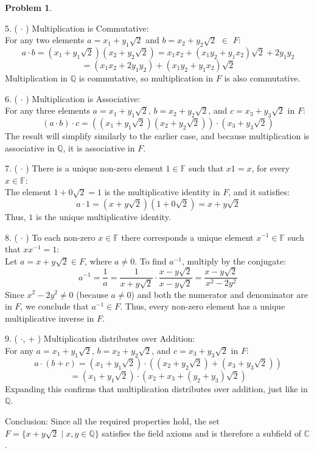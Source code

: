 \documentclass[12pt]{article}
\theoremstyle{definition}
\newtheorem{problem}{Problem}
\begin{document}
\begin{problem}
\begin{solution}
        5. ( $\cdot$ ) Multiplication is Commutative:\\
        For any two elements \( a = x_1 + y_1\sqrt{2} \) and \( b = x_2 + y_2\sqrt{2} \) $\in$ \( F \):
        \[
        a \cdot b = (x_1 + y_1\sqrt{2})(x_2 + y_2\sqrt{2}) = x_1x_2 + (x_1y_2 + y_1x_2)\sqrt{2} + 2y_1y_2
        \]
        \[
        = (x_1x_2 + 2y_1y_2) + (x_1y_2 + y_1x_2)\sqrt{2}
        \]
        Multiplication in \( \mathbb{Q} \) is commutative, so multiplication in \( F \) is also commutative.

        6. ( $\cdot$ ) Multiplication is Associative:\\
        For any three elements \( a = x_1 + y_1\sqrt{2} \), \( b = x_2 + y_2\sqrt{2} \), and \( c = x_3 + y_3\sqrt{2} \) in \( F \):
        \[
        (a \cdot b) \cdot c = \left( (x_1 + y_1\sqrt{2})(x_2 + y_2\sqrt{2}) \right) \cdot (x_3 + y_3\sqrt{2})
        \]
        The result will simplify similarly to the earlier case, and because multiplication is associative in \( \mathbb{Q} \), it is associative in \( F \).

        7. ( $\cdot$ ) There is a unique non-zero element $1 \in \mathbb{F}$ such that $x1 = x$, for every $x\in\mathbb{F}$:\\
        The element \( 1 + 0\sqrt{2} = 1 \) is the multiplicative identity in \( F \), and it satisfies:
        \[
        a \cdot 1 = (x + y\sqrt{2})(1 + 0\sqrt{2}) = x + y\sqrt{2}
        \]
        Thus, \( 1 \) is the unique multiplicative identity.

        8. ( $\cdot$ ) To each non-zero $x \in\mathbb{F}$ there corresponds a unique element $x^{-1}\in\mathbb{F}$ such that $xx^{-1} = 1$:\\
        Let \( a = x + y\sqrt{2} \in F \), where \( a \neq 0 \). To find \( a^{-1} \), multiply by the conjugate:
        \[
        a^{-1} = \frac{1}{a} = \frac{1}{x + y\sqrt{2}} \cdot \frac{x - y\sqrt{2}}{x - y\sqrt{2}} = \frac{x - y\sqrt{2}}{x^2 - 2y^2}
        \]
        Since \( x^2 - 2y^2 \neq 0 \) (because \( a \neq 0 \)) and both the numerator and denominator are in \( F \), we conclude that \( a^{-1} \in F \). Thus, every non-zero element has a unique multiplicative inverse in \( F \).

        9. ( $\cdot$, + ) Multiplication distributes over Addition:\\
        For any \( a = x_1 + y_1\sqrt{2} \), \( b = x_2 + y_2\sqrt{2} \), and \( c = x_3 + y_3\sqrt{2} \) in \( F \):
        \[
        a \cdot (b + c) = (x_1 + y_1\sqrt{2}) \cdot ((x_2 + y_2\sqrt{2}) + (x_3 + y_3\sqrt{2}))
        \]
        \[
        = (x_1 + y_1\sqrt{2}) \cdot (x_2 + x_3 + (y_2 + y_3)\sqrt{2})
        \]
        Expanding this confirms that multiplication distributes over addition, just like in \( \mathbb{Q} \).

        Conclusion: Since all the required properties hold, the set \( F = \{ x + y\sqrt{2} \mid x, y \in \mathbb{Q} \} \) satisfies the field axioms and is therefore a subfield of \( \mathbb{C} \).

    \end{solution}
\end{problem}
\end{document}
